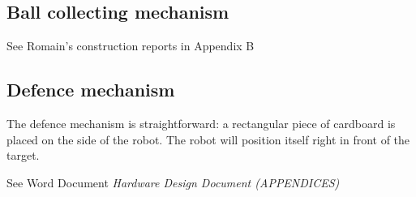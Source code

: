 \documentclass[]{article}
\begin{document}
\subsection{Ball collecting mechanism}
See Romain's construction reports in Appendix B
\subsection{Defence mechanism}
The defence mechanism is straightforward: a rectangular piece of cardboard is placed on the side of the robot.  The robot will position itself right in front of the target.

\newpage

\begin{appendices}
See Word Document \textit{Hardware Design Document (APPENDICES)} 
\end{appendices}
\end{document}
